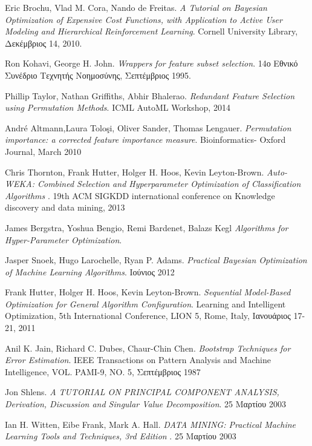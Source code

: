 \documentclass{article}
\begin{document}
\begin{thebibliography}{9}

Eric Brochu, Vlad M. Cora, Nando de Freitas.
\textit{A Tutorial on Bayesian Optimization of
Expensive Cost Functions, with Application to
Active User Modeling and Hierarchical
Reinforcement Learning}. 
Cornell University Library, Δεκέμβριος 14, 2010.

Ron Kohavi, George H. John.
\textit{Wrappers for feature subset selection}. 
14ο Εθνικό Συνέδριο Τεχνητής Νοημοσύνης, Σεπτέμβριος 1995.

Phillip Taylor, Nathan Griffiths, Abhir Bhalerao.
\textit{Redundant Feature Selection using Permutation Methods}. 
ICML  AutoML Workshop, 2014

André Altmann,Laura Toloşi, Oliver Sander, Thomas Lengauer.
\textit{Permutation importance: a corrected feature importance measure}. 
Bioinformatics- Oxford Journal, March 2010

Chris Thornton, Frank Hutter, Holger H. Hoos, Kevin Leyton-Brown.
\textit{Auto-WEKA: Combined Selection and Hyperparameter
Optimization of Classification Algorithms
}. 
19th ACM SIGKDD international conference on Knowledge discovery and data mining, 2013

James Bergstra, Yoshua Bengio, Remi Bardenet, Balazs Kegl
\textit{Algorithms for Hyper-Parameter Optimization}. 

Jasper Snoek, Hugo Larochelle, Ryan P. Adams.
\textit{Practical Bayesian Optimization of Machine
Learning Algorithms}. 
Ιούνιος 2012 


Frank Hutter, Holger H. Hoos, Kevin Leyton-Brown.
\textit{Sequential Model-Based Optimization for
General Algorithm Configuration}. 
Learning and Intelligent Optimization, 5th International Conference, LION 5, Rome, Italy, Ιανουάριος 17-21, 2011

Anil K. Jain, Richard C. Dubes, Chaur-Chin Chen.
\textit{Bootstrap Techniques for Error Estimation}. 
IEEE Transactions on Pattern Analysis and Machine Intelligence, VOL. PAMI-9, NO. 5, Σεπτέμβριος 1987

Jon Shlens.
\textit{A TUTORIAL ON PRINCIPAL COMPONENT ANALYSIS, Derivation, Discussion and Singular Value Decomposition}. 
25 Μαρτίου 2003

Ian H. Witten, Eibe Frank, Mark A. Hall. 
\textit{DATA MINING: Practical Machine Learning Tools and Techniques, 3rd Edition }. 
25 Μαρτίου 2003


\end{thebibliography}
\end{document}
